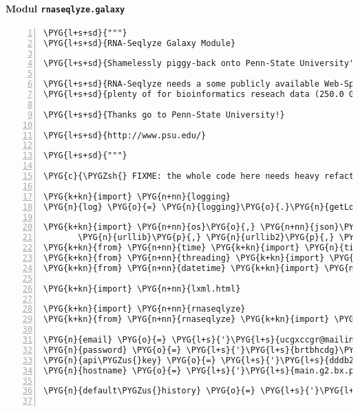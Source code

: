 \paragraph{Modul \texttt{rnaseqlyze.galaxy}}
\label{rnaseqlyze-pdf:modul-rnaseqlyze-galaxy}
\begin{Verbatim}[commandchars=\\\{\},numbers=left,firstnumber=1,stepnumber=5]
\PYG{l+s+sd}{"""}
\PYG{l+s+sd}{RNA-Seqlyze Galaxy Module}

\PYG{l+s+sd}{Shamelessly piggy-back onto Penn-State University's "Galaxy" Project.}

\PYG{l+s+sd}{RNA-Seqlyze needs a some publicly available Web-Space, which PSU provides}
\PYG{l+s+sd}{plenty of for bioinformatics reseach data (250.0 Gb per user as of 4 Jul 2012).}

\PYG{l+s+sd}{Thanks go to Penn-State University!}

\PYG{l+s+sd}{http://www.psu.edu/}

\PYG{l+s+sd}{"""}

\PYG{c}{\PYGZsh{} FIXME: the whole code here needs heavy refactoring}

\PYG{k+kn}{import} \PYG{n+nn}{logging}
\PYG{n}{log} \PYG{o}{=} \PYG{n}{logging}\PYG{o}{.}\PYG{n}{getLogger}\PYG{p}{(}\PYG{n}{\PYGZus{}\PYGZus{}name\PYGZus{}\PYGZus{}}\PYG{p}{)}

\PYG{k+kn}{import} \PYG{n+nn}{os}\PYG{o}{,} \PYG{n+nn}{json}\PYG{o}{,} \PYG{n+nn}{time}\PYG{o}{,} \PYG{n+nn}{ftplib}\PYG{o}{,} \PYGZbs{}
       \PYG{n}{urllib}\PYG{p}{,} \PYG{n}{urllib2}\PYG{p}{,} \PYG{n}{cookielib}
\PYG{k+kn}{from} \PYG{n+nn}{time} \PYG{k+kn}{import} \PYG{n}{time}
\PYG{k+kn}{from} \PYG{n+nn}{threading} \PYG{k+kn}{import} \PYG{n}{local}
\PYG{k+kn}{from} \PYG{n+nn}{datetime} \PYG{k+kn}{import} \PYG{n}{datetime}\PYG{p}{,} \PYG{n}{timedelta}

\PYG{k+kn}{import} \PYG{n+nn}{lxml.html}

\PYG{k+kn}{import} \PYG{n+nn}{rnaseqlyze}
\PYG{k+kn}{from} \PYG{n+nn}{rnaseqlyze} \PYG{k+kn}{import} \PYG{n}{multipart}

\PYG{n}{email} \PYG{o}{=} \PYG{l+s}{'}\PYG{l+s}{ucgxccgr@mailinator.com}\PYG{l+s}{'}
\PYG{n}{password} \PYG{o}{=} \PYG{l+s}{'}\PYG{l+s}{brtbhcdg}\PYG{l+s}{'}
\PYG{n}{api\PYGZus{}key} \PYG{o}{=} \PYG{l+s}{'}\PYG{l+s}{dddb2c53c96c0c4d263e6c74b507d203}\PYG{l+s}{'}
\PYG{n}{hostname} \PYG{o}{=} \PYG{l+s}{'}\PYG{l+s}{main.g2.bx.psu.edu}\PYG{l+s}{'}

\PYG{n}{default\PYGZus{}history} \PYG{o}{=} \PYG{l+s}{'}\PYG{l+s}{16f9a8e916e0e908}\PYG{l+s}{'}


\end{Verbatim}

